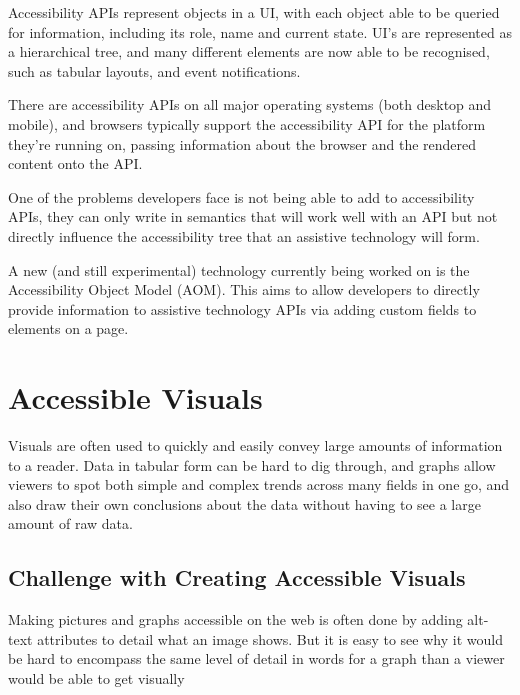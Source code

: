\documentclass[ %
                    author={Aleena Baig},
                supervisor={Dr Simon Lock},
                    degree={BSc},
                     title={On Making Web Accessible Graphs},
                  subtitle={},
                      year={2019} ]{dissertation}
\begin{document}
Accessibility APIs represent objects in a UI, with each object able to be queried for information, including its role, name and current state. UI's are represented as a hierarchical tree, and many different elements are now able to be recognised, such as tabular layouts, and event notifications.

There are accessibility APIs on all major operating systems (both desktop and mobile), and browsers typically support the accessibility API for the platform they're running on, passing information about the browser and the rendered content onto the API.

One of the problems developers face is not being able to add to accessibility APIs, they can only write in semantics that will work well with an API but not directly influence the accessibility tree that an assistive technology will form.

A new (and still experimental) technology currently being worked on is the Accessibility Object Model (AOM). This aims to allow developers to directly provide information to assistive technology APIs via adding custom fields to elements on a page.

\section{Accessible Visuals}

Visuals are often used to quickly and easily convey large amounts of information to a reader. Data in tabular form can be hard to dig through, and graphs allow viewers to spot both simple and complex trends across many fields in one go, and also draw their own conclusions about the data without having to see a large amount of raw data.


\subsection{Challenge with Creating Accessible Visuals}

Making pictures and graphs accessible on the web is often done by adding alt-text attributes to detail what an image shows. But it is easy to see why it would be hard to encompass the same level of detail in words for a graph than a viewer would be able to get visually
\end{document}
